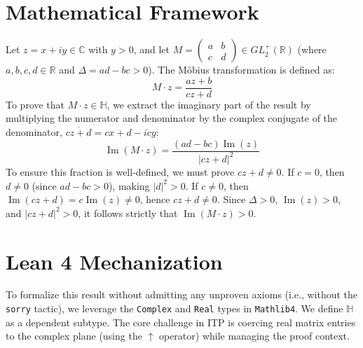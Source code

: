\documentclass[11pt, a4paper]{article}
\theoremstyle{remark}
\begin{document}
\section{Mathematical Framework}

Let $z = x + iy \in \mathbb{C}$ with $y > 0$, and let $M = \begin{pmatrix} a & b \\ c & d \end{pmatrix} \in GL_2^+(\mathbb{R})$ (where $a, b, c, d \in \mathbb{R}$ and $\Delta = ad - bc > 0$). The Möbius transformation is defined as:
\begin{equation}
M \cdot z = \frac{az + b}{cz + d}
\end{equation}
To prove that $M \cdot z \in \mathbb{H}$, we extract the imaginary part of the result by multiplying the numerator and denominator by the complex conjugate of the denominator, $\overline{cz+d} = cx+d - icy$:
\begin{equation}
\operatorname{Im}(M \cdot z) = \frac{(ad - bc)\operatorname{Im}(z)}{|cz+d|^2}
\label{eq:im_part}
\end{equation}
To ensure this fraction is well-defined, we must prove $cz+d \neq 0$. If $c=0$, then $d \neq 0$ (since $ad-bc>0$), making $|d|^2 > 0$. If $c \neq 0$, then $\operatorname{Im}(cz+d) = c \operatorname{Im}(z) \neq 0$, hence $cz+d \neq 0$. Since $\Delta > 0$, $\operatorname{Im}(z) > 0$, and $|cz+d|^2 > 0$, it follows strictly that $\operatorname{Im}(M \cdot z) > 0$.

\section{Lean 4 Mechanization}

To formalize this result without admitting any unproven axioms (i.e., without the \texttt{sorry} tactic), we leverage the \texttt{Complex} and \texttt{Real} types in \texttt{Mathlib4}. We define $\mathbb{H}$ as a dependent subtype. The core challenge in ITP is coercing real matrix entries to the complex plane (using the \texttt{$\uparrow$} operator) while managing the proof context.
\end{document}
